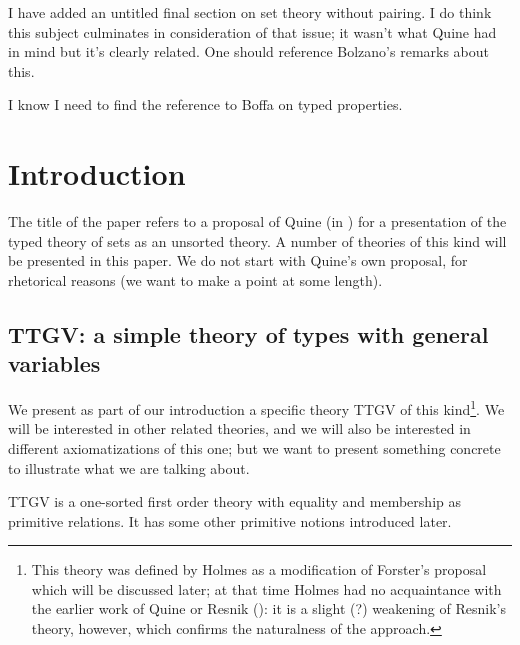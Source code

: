 \documentclass[12pt]{article}
\begin{document}
\begin{description}
I have added an untitled final section on set theory without pairing.  I do think this subject culminates in consideration of that issue;  it wasn't what Quine had in mind but it's clearly related.  One should reference Bolzano's remarks about this.

I know I need to find the reference to Boffa on typed properties.

\end{description}

\newpage

\section{Introduction}

The title of the paper refers to a proposal of Quine (in
\cite{quiettgv}) for a presentation of the typed theory of sets as an
unsorted theory.  A number of theories of this kind will be presented
in this paper.  We do not start with Quine's own proposal, for
rhetorical reasons (we want to make a point at some length).

\subsection{TTGV:  a simple theory of types with general variables}

We present as part of our introduction a specific theory TTGV of this
kind\footnote{This theory was defined by Holmes as a modification of Forster's proposal which will be discussed later; at that time Holmes had no acquaintance with the earlier work of Quine or Resnik (\cite{resnikttgv}):  it is a slight (?) weakening of Resnik's theory, however, which confirms the naturalness of the approach.}.  We will be interested in other related theories, and we will
also be interested in different axiomatizations of this one; but we
want to present something concrete to illustrate what we are talking
about.

TTGV is a one-sorted first order theory with equality and membership as primitive relations.  It has some other primitive notions introduced later.
\end{document}
